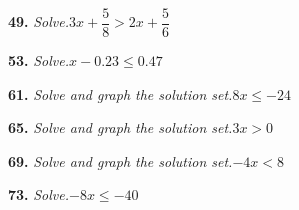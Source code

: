 \documentclass{ximera}
\begin{document}
\begin{problem}
\textbf{49.} \emph{Solve.}\quad $3x + \dfrac{5}{8} > 2x + \dfrac{5}{6}$

\begin{multipleChoice}
\end{multipleChoice}
\end{problem}

\begin{problem}
\textbf{53.} \emph{Solve.}\quad $x - 0.23 \le 0.47$

\begin{multipleChoice}
\end{multipleChoice}
\end{problem}

\begin{problem}
\textbf{61.} \emph{Solve and graph the solution set.}\quad $8x \le -24$

\begin{multipleChoice}
\end{multipleChoice}
\end{problem}

\begin{problem}
\textbf{65.} \emph{Solve and graph the solution set.}\quad $3x > 0$

\begin{multipleChoice}
\end{multipleChoice}
\end{problem}

\begin{problem}
\textbf{69.} \emph{Solve and graph the solution set.}\quad $-4x < 8$

\begin{multipleChoice}
\end{multipleChoice}
\end{problem}

\begin{problem}
\textbf{73.} \emph{Solve.}\quad $-8x \le -40$

\begin{multipleChoice}
\end{multipleChoice}
\end{problem}
\end{document}
